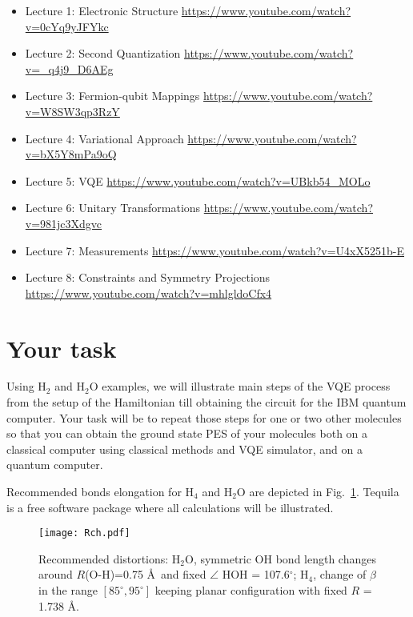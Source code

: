 \documentclass[12pt]{article}
\begin{document}
\begin{itemize}
\item Lecture 1: Electronic Structure \url{https://www.youtube.com/watch?v=0cYq9yJFYkc}
\item Lecture 2: Second Quantization \url{https://www.youtube.com/watch?v=_q4j9_D6AEg}
\item Lecture 3: Fermion-qubit Mappings \url{https://www.youtube.com/watch?v=W8SW3qp3RzY} 
\item Lecture 4:  Variational Approach \url{https://www.youtube.com/watch?v=bX5Y8mPa9oQ}
\item Lecture 5:  VQE \url{https://www.youtube.com/watch?v=UBkb54_MOLo}
\item Lecture 6:  Unitary Transformations \url{https://www.youtube.com/watch?v=981jc3Xdgvc}
\item Lecture 7:  Measurements \url{https://www.youtube.com/watch?v=U4xX5251b-E}
\item Lecture 8:  Constraints and Symmetry Projections \url{https://www.youtube.com/watch?v=mhlgldoCfx4}
\end{itemize}

\section*{Your task} \label{sec:tasks}

Using H$_2$ and H$_2$O examples, 
we will illustrate main steps of the VQE process from the setup of the Hamiltonian till obtaining the circuit for the IBM quantum computer. 
Your task will be to repeat those steps for one or two other molecules so that you can obtain the ground state PES of your molecules 
both on a classical computer using classical methods and VQE simulator, and on a quantum computer. 

Recommended bonds elongation for H$_4$ and H$_2$O are depicted in Fig.~\ref{fig:Rch}.   
Tequila is a free software package where all calculations will be illustrated.

\begin{figure}
    \begin{center}
        \texttt{[image: Rch.pdf]}
    \end{center}
    \caption{Recommended distortions: H$_2$O, symmetric OH bond length changes around $R$(O-H)=0.75 \AA~and fixed 
    $\angle$ HOH = 107.6$^\circ$; H$_4$, change of $\beta$ in the range $[85^\circ,95^\circ]$ keeping planar configuration with fixed $R$ = 1.738 \AA.}
    \label{fig:Rch}
\end{figure}
\end{document}
